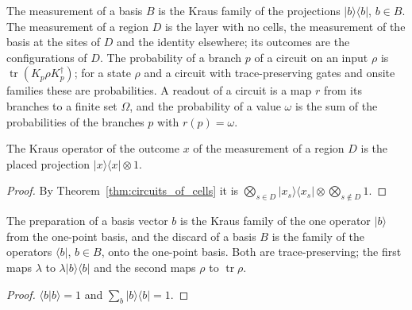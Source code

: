 \begin{definition}
    \label{def:circuits_outcome}
    \leanok
    The measurement of a basis $B$ is the Kraus family of the projections
    $\lvert b\rangle\langle b\rvert$, $b\in B$. The measurement of a region $D$ is
    the layer with no cells, the measurement of the basis at the sites of $D$ and the
    identity elsewhere; its outcomes are the configurations of $D$. The
    probability of a branch $p$ of a circuit on an input $\rho$ is
    $\operatorname{tr}(K_p\rho K_p^\dagger)$; for a state $\rho$ and a circuit with
    trace-preserving gates and onsite families these are probabilities. A readout of a
    circuit is a map $r$ from its branches to a finite set $\Omega$, and the probability of a value
    $\omega$ is the sum of the probabilities of the branches $p$ with $r(p)=\omega$.
\end{definition}

\begin{lemma}
    \label{lem:circuits_measure_kraus}
    \leanok
    The Kraus operator of the outcome $x$ of the measurement of a region $D$ is the
    placed projection $\lvert x\rangle\langle x\rvert\otimes1$.
\end{lemma}
\begin{proof}\leanok
    By Theorem~\ref{thm:circuits_of_cells} it is
    $\bigotimes_{s\in D}\lvert x_s\rangle\langle x_s\rvert\otimes\bigotimes_{s\notin D}1$.
\end{proof}

\begin{lemma}
    \label{lem:circuits_prepare_discard}
    \leanok
    The preparation of a basis vector $b$ is the Kraus family of the one operator
    $\lvert b\rangle$ from the one-point basis, and the discard of a basis $B$ is the
    family of the operators $\langle b\rvert$, $b\in B$, onto the one-point basis. Both
    are trace-preserving; the first maps $\lambda$ to
    $\lambda\lvert b\rangle\langle b\rvert$ and the second maps $\rho$ to
    $\operatorname{tr}\rho$.
\end{lemma}
\begin{proof}\leanok
    $\langle b\vert b\rangle=1$ and $\sum_b\lvert b\rangle\langle b\rvert=1$.
\end{proof}


